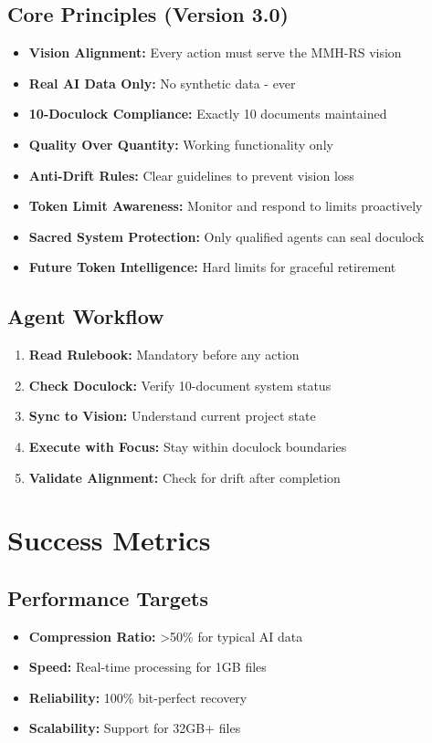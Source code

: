 \documentclass[12pt,a4paper]{article}
\begin{document}
\subsection{Core Principles (Version 3.0)}
\begin{itemize}
    \item \textbf{Vision Alignment:} Every action must serve the MMH-RS vision
    \item \textbf{Real AI Data Only:} No synthetic data - ever
    \item \textbf{10-Doculock Compliance:} Exactly 10 documents maintained
    \item \textbf{Quality Over Quantity:} Working functionality only
    \item \textbf{Anti-Drift Rules:} Clear guidelines to prevent vision loss
    \item \textbf{Token Limit Awareness:} Monitor and respond to limits proactively
    \item \textbf{Sacred System Protection:} Only qualified agents can seal doculock
    \item \textbf{Future Token Intelligence:} Hard limits for graceful retirement
\end{itemize}

\subsection{Agent Workflow}
\begin{enumerate}
    \item \textbf{Read Rulebook:} Mandatory before any action
    \item \textbf{Check Doculock:} Verify 10-document system status
    \item \textbf{Sync to Vision:} Understand current project state
    \item \textbf{Execute with Focus:} Stay within doculock boundaries
    \item \textbf{Validate Alignment:} Check for drift after completion
\end{enumerate}

\section{Success Metrics}

\subsection{Performance Targets}
\begin{itemize}
    \item \textbf{Compression Ratio:} >50\% for typical AI data
    \item \textbf{Speed:} Real-time processing for 1GB files
    \item \textbf{Reliability:} 100\% bit-perfect recovery
    \item \textbf{Scalability:} Support for 32GB+ files
\end{itemize}
\end{document}
